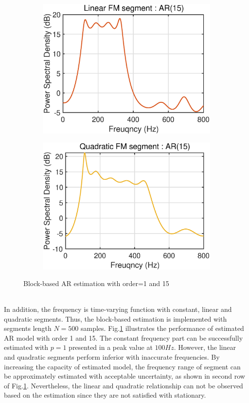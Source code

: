 \begin{figure}[htb]
\begin{subfigure}[b]{0.32\textwidth}
         \includegraphics[width=\textwidth]{fig/32/32a9.eps}
     \end{subfigure}
    \hspace{-0.4cm}
     \begin{subfigure}[b]{0.32\textwidth}
         \centering
         \includegraphics[width=\textwidth]{fig/32/32a10.eps}
     \end{subfigure}
        \caption{Block-based AR estimation with order=1 and 15}
        \label{fig:3_2_a3}
\end{figure}\\
In addition, the frequency is time-varying function with constant, linear and quadratic segments. Thus, the block-based estimation is implemented with segments length $N=500$ samples. Fig.\ref{fig:3_2_a3} illustrates the performance of estimated AR model with order 1 and 15. The constant frequency part can be successfully estimated with $p=1$ presented in a peak value at $100Hz$. However, the linear and quadratic segments perform inferior with inaccurate frequencies. By increasing the capacity of estimated model, the frequency range of segment can be approximately estimated with acceptable uncertainty, as shown in second row of Fig.\ref{fig:3_2_a3}. Nevertheless, the linear and quadratic relationship can not be observed based on the estimation since they are not satisfied with stationary.

